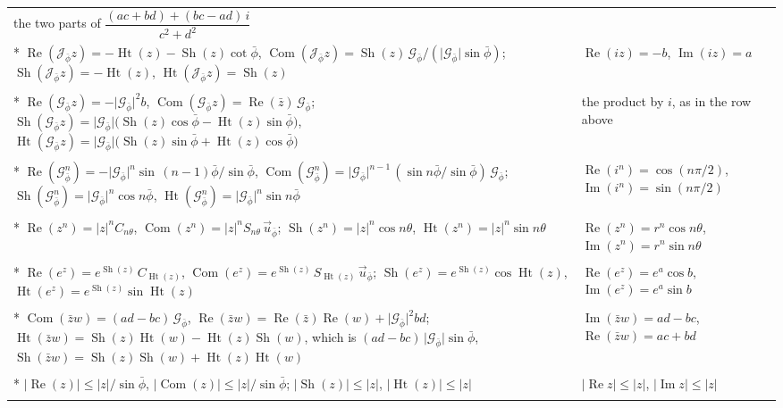 \documentclass[11pt,a4paper]{amsart}
\makeatletter
\theoremstyle{plain}
\theoremstyle{definition}
\theoremstyle{remark}
\newcommand{\pb}{\bar{\phi}}                     %
\newcommand{\Gp}{\mathcal{G}_{\bar{\phi}}}       %
\newcommand{\up}{\vec{u}_{\bar{\phi}}}           %
\newcommand{\Jp}{\mathcal{J}_{\bar{\phi}}}       %
\renewcommand{\Re}{\operatorname{Re}}            %
\DeclareMathOperator{\Com}{Com}                  %
\DeclareMathOperator{\Sh}{Sh}                    %
\DeclareMathOperator{\Ht}{Ht}                    %
\newcommand{\gnlaw}[3]{\multicolumn{2}{@{}l@{}}{\small\itshape #1}\\* #2 & #3 \\ \addlinespace[4pt]}
\newenvironment{gnlawswide}{%
  \begin{longtable}{@{}>{\small\raggedright\arraybackslash\relpenalty=10000 \binoppenalty=10000 }p{0.64\textwidth}@{\hspace{0.03\textwidth}}>{\small\raggedright\arraybackslash}p{0.32\textwidth}@{}}
  \toprule
  \multicolumn{1}{@{}l}{\textsc{in a relative plane}} & \multicolumn{1}{l@{}}{\textsc{the complex case}} \\
  \midrule
  \endhead
  \bottomrule
  \endlastfoot}
  {\end{longtable}}
\makeatother
\begin{document}
\begin{gnlawswide}
  {the two parts of \newline $\dfrac{(ac + bd) + (bc - ad)\,i}{c^2 + d^2}$}
\gnlaw{a quarter turn, the product by $\Jp$ (\Cref{thm:turning-unit,thm:parts-product})}
  {$\Re(\Jp z) = -\Ht(z) - \Sh(z)\cot\pb$, \quad $\Com(\Jp z) = \Sh(z)\,\Gp/(\lvert\Gp\rvert\sin\pb)$; \newline $\Sh(\Jp z) = -\Ht(z)$, \quad $\Ht(\Jp z) = \Sh(z)$}
  {$\operatorname{Re}(iz) = -b$, \newline $\operatorname{Im}(iz) = a$}
\gnlaw{the product by the Composer Unit (\Cref{thm:parts-product})}
  {$\Re(\Gp z) = -\lvert\Gp\rvert^2 b$, \quad $\Com(\Gp z) = \Re(\bar{z})\,\Gp$; \newline $\Sh(\Gp z) = \lvert\Gp\rvert\bigl(\Sh(z)\cos\pb - \Ht(z)\sin\pb\bigr)$, \newline $\Ht(\Gp z) = \lvert\Gp\rvert\bigl(\Sh(z)\sin\pb + \Ht(z)\cos\pb\bigr)$}
  {the product by $i$, \newline as in the row above}
\gnlaw{the powers of the Composer Unit (\Cref{cor:powers,cor:two-trig})}
  {$\Re(\Gp^n) = -\lvert\Gp\rvert^n\sin\,(n - 1)\pb/\sin\pb$, \quad $\Com(\Gp^n) = \lvert\Gp\rvert^{n-1}\,(\sin n\pb/\sin\pb)\,\Gp$; \newline $\Sh(\Gp^n) = \lvert\Gp\rvert^n\cos n\pb$, \quad $\Ht(\Gp^n) = \lvert\Gp\rvert^n\sin n\pb$}
  {$\operatorname{Re}(i^n) = \cos(n\pi/2)$, \newline $\operatorname{Im}(i^n) = \sin(n\pi/2)$}
\gnlaw{powers, and for $n = 1$ the polar form (\Cref{cor:two-trig})}
  {$\Re(z^n) = \lvert z\rvert^n C_{n\theta}$, \quad $\Com(z^n) = \lvert z\rvert^n S_{n\theta}\,\up$; \newline $\Sh(z^n) = \lvert z\rvert^n\cos n\theta$, \quad $\Ht(z^n) = \lvert z\rvert^n\sin n\theta$}
  {$\operatorname{Re}(z^n) = r^n\cos n\theta$, \newline $\operatorname{Im}(z^n) = r^n\sin n\theta$}
\gnlaw{exponential (\Cref{cor:two-trig})}
  {$\Re(e^z) = e^{\Sh(z)}\,C_{\Ht(z)}$, \quad $\Com(e^z) = e^{\Sh(z)}\,S_{\Ht(z)}\,\up$; \newline $\Sh(e^z) = e^{\Sh(z)}\cos\Ht(z)$, \quad $\Ht(e^z) = e^{\Sh(z)}\sin\Ht(z)$}
  {$\operatorname{Re}(e^z) = e^a\cos b$, \newline $\operatorname{Im}(e^z) = e^a\sin b$}
\gnlaw{signed area and dot product (\Cref{prop:signed-area})}
  {$\Com(\bar{z}w) = (ad - bc)\,\Gp$, \quad $\Re(\bar{z}w) = \Re(\bar{z})\Re(w) + \lvert\Gp\rvert^2 bd$; \newline $\Ht(\bar{z}w) = \Sh(z)\Ht(w) - \Ht(z)\Sh(w)$, which is $(ad - bc)\,\lvert\Gp\rvert\sin\pb$, \newline $\Sh(\bar{z}w) = \Sh(z)\Sh(w) + \Ht(z)\Ht(w)$}
  {$\operatorname{Im}(\bar{z}w) = ad - bc$, \newline $\operatorname{Re}(\bar{z}w) = ac + bd$}
\gnlaw{size (\Cref{rem:longer})}
  {$\lvert\Re(z)\rvert \le \lvert z\rvert/\sin\pb$, \quad $\lvert\Com(z)\rvert \le \lvert z\rvert/\sin\pb$; \newline $\lvert\Sh(z)\rvert \le \lvert z\rvert$, \quad $\lvert\Ht(z)\rvert \le \lvert z\rvert$}
  {$\lvert\operatorname{Re} z\rvert \le \lvert z\rvert$, \newline $\lvert\operatorname{Im} z\rvert \le \lvert z\rvert$}
\end{gnlawswide}
\end{document}
